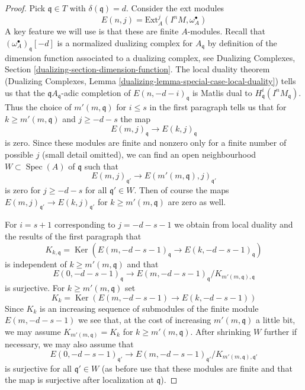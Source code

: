 \documentclass[10pt,a4paper]{amsart}
\theoremstyle{plain}
\theoremstyle{definition}
\theoremstyle{remark}
\numberwithin{equation}{subsection}
\def\Spec{\mathop{\mathrm{Spec}}}
\def\Ker{\mathop{\mathrm{Ker}}}
\begin{document}
\begin{proof}
\medskip\noindent
Pick $\mathfrak q \in T$ with $\delta(\mathfrak q) = d$.
Consider the ext modules
$$
E(n, j) = \text{Ext}^j_A(I^nM, \omega_A^\bullet)
$$
A key feature we will use is that these are finite $A$-modules.
Recall that $(\omega_A^\bullet)_\mathfrak q[-d]$ is a normalized
dualizing complex for $A_\mathfrak q$ by definition of the
dimension function associated to a dualizing complex, see
Dualizing Complexes, Section \ref{dualizing-section-dimension-function}.
The local duality theorem (Dualizing Complexes, Lemma
\ref{dualizing-lemma-special-case-local-duality}) tells us that
the $\mathfrak qA_\mathfrak q$-adic completion of
$E(n, -d - i)_\mathfrak q$ is Matlis dual to
$H^i_\mathfrak q(I^nM_\mathfrak q)$. Thus the choice of
$m'(m, \mathfrak q)$ for $i \leq s$ in the first paragraph tells us that
for $k \geq m'(m, \mathfrak q)$ and $j \geq -d - s$ the map
$$
E(m, j)_\mathfrak q \to E(k, j)_\mathfrak q
$$
is zero. Since these modules are finite and nonzero only
for a finite number of possible $j$ (small detail omitted),
we can find an open neighbourhood $W \subset \Spec(A)$ of $\mathfrak q$
such that
$$
E(m, j)_{\mathfrak q'} \to E(m'(m, \mathfrak q), j)_{\mathfrak q'}
$$
is zero for $j \geq -d - s$ for all $\mathfrak q' \in W$.
Then of course the maps $E(m, j)_{\mathfrak q'} \to E(k, j)_{\mathfrak q'}$
for $k \geq m'(m, \mathfrak q)$ are zero as well.

\medskip\noindent
For $i = s + 1$ corresponding to $j = - d - s - 1$ we obtain
from local duality and the results of the first paragraph that
$$
K_{k, \mathfrak q} =
\Ker(E(m, -d - s - 1)_\mathfrak q \to E(k, -d - s - 1)_\mathfrak q)
$$
is independent of $k \geq m'(m, \mathfrak q)$ and that
$$
E(0, -d - s - 1)_\mathfrak q \to
E(m, -d - s - 1)_\mathfrak q/K_{m'(m, \mathfrak q), \mathfrak q}
$$
is surjective. For $k \geq m'(m, \mathfrak q)$ set
$$
K_k = \Ker(E(m, -d - s - 1) \to E(k, -d - s - 1))
$$
Since $K_k$ is an increasing sequence of submodules of the finite
module $E(m, -d - s - 1)$ we see that, at the cost of increasing
$m'(m, \mathfrak q)$ a little bit, we may assume
$K_{m'(m, \mathfrak q)} = K_k$ for $k \geq m'(m, \mathfrak q)$.
After shrinking $W$ further if necessary, we may also assume that
$$
E(0, -d - s - 1)_{\mathfrak q'} \to
E(m, -d - s - 1)_{\mathfrak q'}/K_{m'(m, \mathfrak q), \mathfrak q'}
$$
is surjective for all $\mathfrak q' \in W$ (as before use that
these modules are finite
and that the map is surjective after localization at $\mathfrak q$).


\end{proof}
\end{document}
